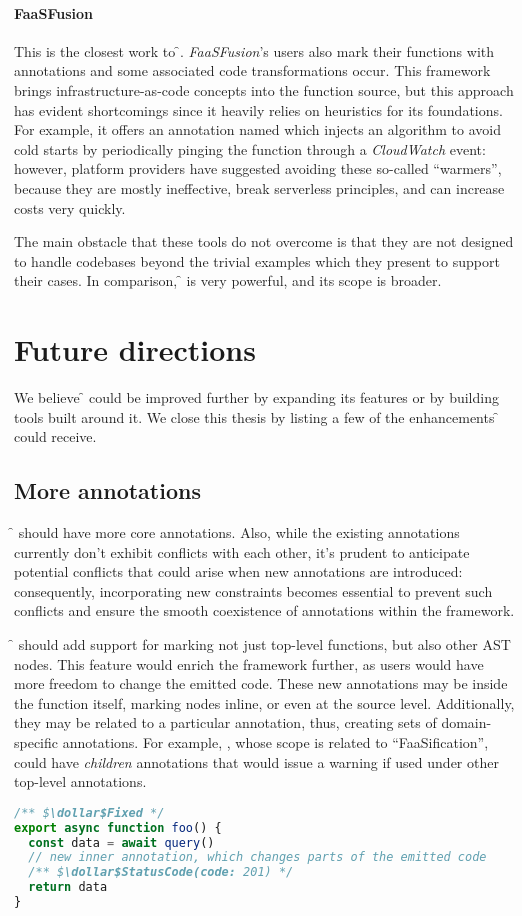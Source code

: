 \paragraph{\textbf{FaaSFusion} \cite{faasfusion}}
This is the closest work to \f{}.
\textit{FaaSFusion}'s users also mark their functions with annotations
and some associated code transformations occur.
This framework brings infrastructure-as-code concepts into the function source,
but this approach has evident shortcomings since it heavily relies on heuristics for its foundations.
For example, it offers an annotation named  which
injects an algorithm to avoid cold starts by periodically pinging the function
through a \textit{CloudWatch} event:
however, platform providers have suggested avoiding these so-called ``warmers'',
because they are mostly ineffective, break serverless principles, and can increase costs very quickly.

The main obstacle that these tools do not overcome is that they are
not designed to handle codebases beyond the trivial examples
which they present to support their cases.
In comparison, \f{} is very powerful, and its scope is broader.

\section{Future directions}

We believe \f{} could be improved further by expanding its features
or by building tools built around it.
We close this thesis by listing a few of the enhancements \f{} could receive.

\subsection{More annotations}

\f{} should have more core annotations.
Also, while the existing annotations currently don't exhibit conflicts with each other,
it's prudent to anticipate potential conflicts that could arise when new annotations are introduced:
consequently, incorporating new constraints becomes essential to prevent such
conflicts and ensure the smooth coexistence of annotations within the framework.

\f{} should add support for marking not just top-level functions, but also other AST nodes.
This feature would enrich the framework further, as users would have more freedom
to change the emitted code. These new annotations may be inside the function itself,
marking nodes inline, or even at the source level. Additionally, they may be related to a particular annotation,
thus, creating sets of domain-specific annotations.
For example, , whose scope is related to ``FaaSification'',
could have \textit{children} annotations that would issue a warning if used under other top-level annotations.
\begin{lstlisting}[language=javascript]
/** $\dollar$Fixed */
export async function foo() {
  const data = await query()
  // new inner annotation, which changes parts of the emitted code
  /** $\dollar$StatusCode(code: 201) */
  return data
}
\end{lstlisting}

